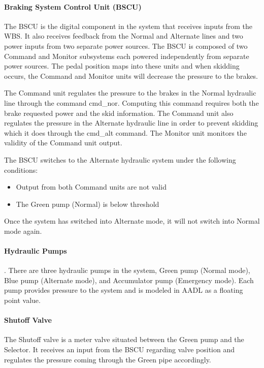 \paragraph{Braking System Control Unit (BSCU)}
The BSCU is the digital component in the system that receives inputs from the WBS. It also receives feedback from the Normal and Alternate lines and two power inputs from two separate power sources. The BSCU is composed of two Command and Monitor subsystems each powered independently from separate power sources. The pedal position maps into these units and when skidding occurs, the Command and Monitor units will decrease the pressure to the brakes.

The Command unit regulates the pressure to the brakes in the Normal hydraulic line through the command cmd\_nor. Computing this command requires both the brake requested power and the skid information. The Command unit also regulates the pressure in the Alternate hydraulic line in order to prevent skidding which it does through the cmd\_alt command. The Monitor unit monitors the validity of the Command unit output.

The BSCU switches to the Alternate hydraulic system under the following conditions:
\begin{itemize}
\item Output from both Command units are not valid
\item The Green pump (Normal) is below threshold
\end{itemize}

\noindent Once the system has switched into Alternate mode, it will not switch into Normal mode again.

\paragraph{Hydraulic Pumps}.
There are three hydraulic pumps in the system, Green pump (Normal mode), Blue pump (Alternate mode), and Accumulator pump (Emergency mode). Each pump provides pressure to the system and is modeled in AADL as a floating point value.

\paragraph{Shutoff Valve}

The Shutoff valve is a meter valve situated between the Green pump and the Selector. It receives an input from the BSCU regarding valve position and regulates the pressure coming through the Green pipe accordingly.

